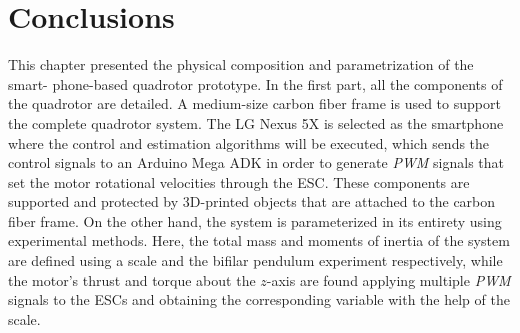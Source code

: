\section{Conclusions}
This chapter presented the physical composition and parametrization of the smart- phone-based quadrotor prototype. In the first part, all the components of the quadrotor are detailed. A medium-size carbon fiber frame is used to support the complete quadrotor system. The LG Nexus 5X is selected as the smartphone where the control and estimation algorithms will be executed, which sends the control signals to an Arduino Mega ADK in order to generate \textit{PWM} signals that set the motor rotational velocities through the ESC. These components are supported and protected by 3D-printed objects that are attached to the carbon fiber frame. On the other hand, the system is parameterized in its entirety using experimental methods. Here, the total mass and moments of inertia of the system are defined using a scale and the bifilar pendulum experiment respectively, while the motor's thrust and torque about the $z$-axis are found applying multiple \textit{PWM} signals to the ESCs and obtaining the corresponding variable with the help of the scale.